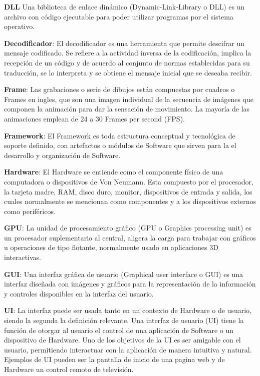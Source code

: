 \textbf{DLL} Una biblioteca de enlace dinámico (Dynamic-Link-Library o DLL) es un archivo con código ejecutable para poder utilizar programas por el sistema operativo.

\textbf{Decodificador}: El decodificador es una herramienta que permite descifrar un mensaje codificado. Se refiere a la actividad inversa de la codificación, implica la recepción de un código y de acuerdo al conjunto de normas establecidas para su traducción, se lo interpreta y se obtiene el mensaje inicial que se deseaba recibir.

\textbf{Frame}: Las grabaciones o serie de dibujos están compuestas por cuadros o Frames en ingles, que son una imagen individual de la secuencia de imágenes que componen la animación para dar la sensación de movimiento. La mayoría de las animaciones emplean de 24 a 30 Frames per second (FPS). 

\textbf{Framework}: El Framework es toda estructura conceptual y tecnológica de soporte definido, con artefactos o módulos de Software que sirven para la el desarrollo y organización de Software.

\textbf{Hardware}: El Hardware se entiende como el componente físico de una computadora o dispositivos de Von Neumann. Esta compuesto por el procesador, la tarjeta madre, RAM, disco duro, monitor, dispositivos de entrada y salida, los cuales normalmente se mencionan como componentes y a los dispositivos externos como periféricos\cite{hardwaredef}.

\textbf{GPU}: La unidad de procesamiento gráfico (GPU o Graphics processing unit) es un procesador suplementario al  central, aligera la carga para trabajar con gráficos u operaciones de tipo flotante, normalmente usado en aplicaciones 3D interactivas. 

\textbf{GUI}: Una interfaz gráfica de usuario (Graphical user interface o GUI) es una interfaz diseñada con imágenes y gráficos para la representación de la información y controles disponibles en la interfaz del usuario.

\textbf{UI}: La interfaz puede ser usada tanto en un contexto de Hardware o de usuario, siendo la segunda la definición relevante.
Una interfaz de usuario (UI) tiene la función de otorgar al usuario el control de una aplicación de Software o un dispositivo de Hardware. Uno de los objetivos de la UI es ser amigable con el usuario, permitiendo interactuar con la aplicación de manera intuitiva y natural. Ejemplos de UI pueden ser la pantalla de inicio de una pagina web y de Hardware un control remoto de televisión.

